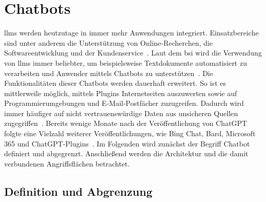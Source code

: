 \section{Chatbots}

\acp{llm} werden heutzutage in immer mehr Anwendungen integriert. Einsatzbereiche sind unter anderem die Unterstützung von Online-Recherchen, die
Softwareentwicklung und der Kundenservice~\cite[3]{pi18}. Laut dem \ac{bsi} wird die Verwendung von \acp{llm} immer beliebter, um beispielsweise Textdokumente 
automatisiert zu verarbeiten und Anwender mittels Chatbots zu unterstützen~\cite[1]{sm08}. Die Funktionalitäten dieser Chatbots werden dauerhaft erweitert. So ist es 
mittlerweile möglich, mittels Plugins Internetseiten auszuwerten sowie auf Programmierumgebungen und E-Mail-Postfächer zuzugreifen. Dadurch 
wird immer häufiger auf nicht vertrauenswürdige Daten aus unsicheren Quellen zugegriffen~\cite[1]{sm08}. Bereits wenige Monate nach der Veröffentlichung von ChatGPT 
folgte eine Vielzahl weiterer Veröffentlichungen, wie Bing Chat, Bard, Microsoft 365 und
ChatGPT-Plugins~\cite[1]{cb09}. Im Folgenden wird zunächst der Begriff Chatbot definiert und abgegrenzt. Anschließend werden die Architektur und die damit verbundenen 
Angriffsflächen betrachtet.

\subsection{Definition und Abgrenzung}

